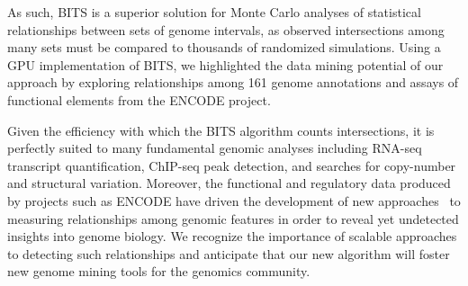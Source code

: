 \documentclass{bioinfo}
\begin{document}
        As such, BITS is a superior solution for Monte 
        Carlo analyses of statistical relationships between sets of genome
        intervals, as observed intersections among many sets must be compared to
        thousands of randomized simulations. Using a GPU implementation of BITS,
        we highlighted the data mining potential of our approach by 
        exploring relationships among 161 genome annotations and assays of 
        functional elements from the ENCODE project.
        
        Given the efficiency with which the BITS algorithm counts intersections,
        it is perfectly suited to many fundamental genomic analyses including 
        RNA-seq transcript quantification, ChIP-seq peak detection, and 
        searches for copy-number and structural variation. Moreover, the 
        functional and regulatory data produced by projects such as ENCODE
        have driven the development of new approaches~\citep{favorov2012} 
        to measuring relationships among genomic features in order to reveal yet 
        undetected insights into genome biology. We recognize the importance of 
        scalable approaches to detecting such relationships and anticipate that 
        our new algorithm will foster new genome mining tools for the 
        genomics community.



        
        
\end{document}
